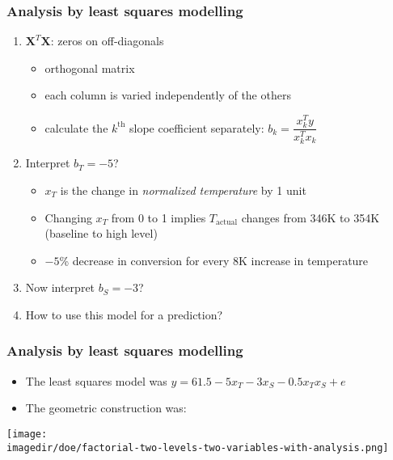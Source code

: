 \begin{frame}\frametitle{Analysis by least squares modelling}
	\vspace{6pt}
	\begin{enumerate}
		\item	$\mathbf{X}^T\mathbf{X}$: zeros on off-diagonals
		\begin{itemize}
			\item	orthogonal matrix
			\item	each column is varied independently of the others
			\item	calculate the $k^\text{th}$ slope coefficient separately: $b_k = \dfrac{x_k^Ty}{x_k^Tx_k}$
		\end{itemize}
		\item	Interpret $b_T = -5$?
		\begin{itemize}
			\item	$x_T$ is the change in \emph{normalized temperature} by 1 unit
			\item	Changing $x_T$ from 0 to 1 implies $T_\text{actual}$ changes from 346K to 354K (baseline to high level)
			\item	$-5$\% decrease in conversion for every 8K increase in temperature
		\end{itemize}
		\item	Now interpret $b_S = -3$?
		\item	How to use this model for a prediction?
	\end{enumerate}
\end{frame}

\begin{frame}\frametitle{Analysis by least squares modelling}
	\begin{itemize}
		\item	{\footnotesize The least squares model was} $y = 61.5 - 5 x_T - 3 x_S - 0.5 x_Tx_S + e$
		\item	The geometric construction was:
	\end{itemize}
	\begin{center}
		\texttt{[image: \\imagedir/doe/factorial-two-levels-two-variables-with-analysis.png]}
	\end{center}
	{}
\end{frame}

